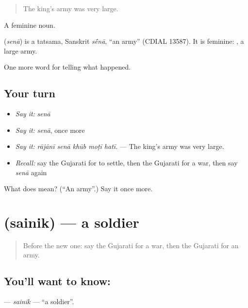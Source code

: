 \begin{quote}
The king's army was very large.
\end{quote}

A feminine noun.

\begin{cousinweb}
\textbf{} (\emph{senā}) is a tatsama, Sanskrit \emph{s\'{\={e}}nā}, \textquotedblleft{}an army\textquotedblright{} (CDIAL 13587). It is feminine: \textbf{ }, a large army.
\end{cousinweb}

\begin{grammarlens}[title={What you've built}]
One more word for telling what happened.
\end{grammarlens}

\subsection*{Your turn}
\begin{itemize}
\raggedright
  \item \emph{Say it:} \emph{senā}
  \item \emph{Say it:} \emph{senā}, once more
  \item \emph{Say it:} \emph{rājānī senā khūb moṭī hatī.} — The king's army was very large.
  \item \emph{Recall:} say the Gujarati for to settle, then the Gujarati for a war, then say \emph{senā} again
\end{itemize}

\begin{tcolorbox}[breakable,colback=teal!4,colframe=teal!35!black,title={Before you move on}]
What does  mean? (\textquotedblleft{}An army\textquotedblright{}.) Say it once more.
\end{tcolorbox}
\section[\texorpdfstring{\gu{સૈનિક} (sainik)}{સૈનિક (sainik)}]{ (sainik) — a soldier}

\label{lesson:GU-C320-sainik}



\begin{quote}
Before the new one: say the Gujarati for a war, then the Gujarati for an army.
\end{quote}

\subsection*{You'll want to know: }
\textbf{} — \emph{sainik} — \textquotedblleft{}a soldier\textquotedblright{}.

